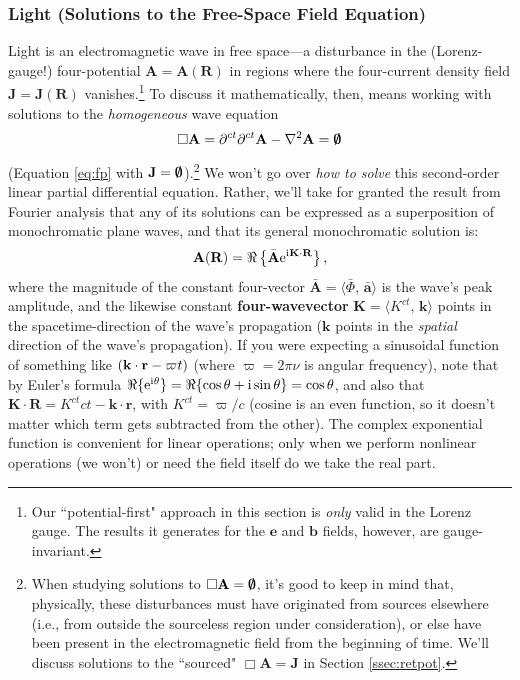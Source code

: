 \documentclass[12pt]{article}
\renewcommand{\vv}[1]{\mathbf{#1}}
\begin{document}
\subsubsection{Light (Solutions to the Free-Space Field Equation)}\label{sssec:li}

Light is an electromagnetic wave in free space---a disturbance in the (Lorenz-gauge!) four-potential $\vv A = \vv A (\vv R)$ in regions where the four-current density field ${\vv J = \vv J (\vv R)}$ vanishes.\footnote{Our ``potential-first" approach in this section is \emph{only} valid in the Lorenz gauge. The results it generates for the $\vv e$ and $\vv b$ fields, however, are gauge-invariant.} To discuss it mathematically, then, means working with solutions to the \emph{homogeneous} wave equation
\begin{equation*}
\Box \vv A = \partial^{ct} \partial^{ct} \vv A - \nabla ^2 \vv A = \textrm{\mbox{\boldmath $\emptyset$}}
\end{equation*}
(Equation \ref{eq:fp} with $\vv J = \textrm{\mbox{\boldmath$\emptyset$}}$).\footnote{When studying solutions to $\Box \vv A = \textrm{\mbox{\boldmath$\emptyset$}}$, it's good to keep in mind that, physically, these disturbances must have originated from sources elsewhere (i.e., from outside the sourceless region under consideration), or else have been present in the electromagnetic field from the beginning of time. We'll discuss solutions to the ``sourced" $\Box \vv A = \vv J$ in Section \ref{ssec:retpot}.} We won't go over \emph{how to solve} this second-order linear partial differential equation. Rather, we'll take for granted the result from Fourier analysis that any of its solutions can be expressed as a superposition of monochromatic plane waves, and that its general monochromatic solution is:
\begin{equation}\label{eq:pw}
\vv A (\vv R) = \Re \left \lbrace \bar{\vv A} \mathrm{e}^{\mathrm{i} \mkern.5mu \vv K \cdot \vv R} \right \rbrace ,
\end{equation}
where the magnitude of the constant four-vector $\bar{\vv A} = \langle \bar{\Phi}, \, \bar{\vv a} \rangle$ is the wave's peak amplitude, and the likewise constant \textbf{four-wavevector} ${\vv K = \langle K^{ct}, \, \vv k \rangle}$ points in the spacetime-direction of the wave's propagation ($\vv k$ points in the \emph{spatial} direction of the wave's propagation). If you were expecting a sinusoidal function of something like $(\vv k \cdot \vv r - \varpi \mkern.5mu t )$ (where $\varpi = 2 \pi \nu$ is angular frequency), note that by Euler's formula ${\Re \lbrace \mathrm{e}^{\mathrm{i} \mkern.5mu \theta} \rbrace = \Re \lbrace \cos \theta + \mathrm{i} \sin \theta \rbrace = \cos \theta}$, and also that $\vv K \cdot \vv R = K^{ct}ct - \vv k \cdot \vv r$, with $K^{ct} = \varpi / c$ (cosine is an even function, so it doesn't matter which term gets subtracted from the other). The complex exponential function is convenient for linear operations; only when we perform nonlinear operations (we won't) or need the field itself do we take the real part.
\end{document}
